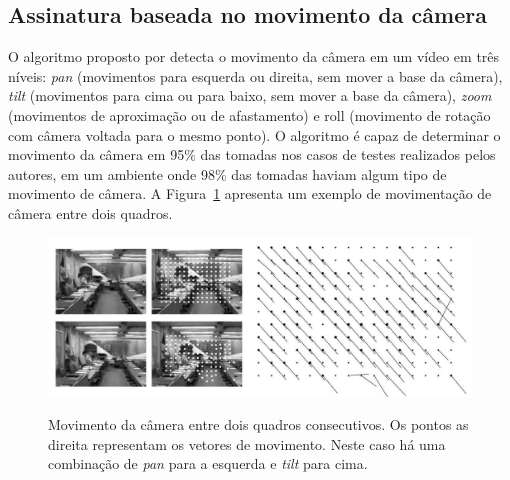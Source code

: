 %
%

\subsection{Assinatura baseada no movimento da câmera}
\label{wavelets}







O algoritmo proposto por  detecta o movimento da câmera em um vídeo em três níveis: \textit{pan} (movimentos para esquerda ou direita, sem mover a base da câmera), \textit{tilt} (movimentos para cima ou para baixo, sem mover a base da câmera), \textit{zoom} (movimentos de aproximação ou de afastamento) e roll (movimento de rotação com câmera voltada para o mesmo ponto). O algoritmo é capaz de determinar o movimento da câmera em 95\% das tomadas nos casos de testes realizados pelos autores, em um ambiente onde 98\% das tomadas haviam algum tipo de movimento de câmera. A Figura~\ref{fig:example_cameramotion} apresenta um exemplo de movimentação de câmera entre dois quadros.

\begin{figure}[h]
	\centering
	\caption{Movimento da câmera entre dois quadros consecutivos. Os pontos as direita representam os vetores de movimento. Neste caso há uma combinação de \textit{pan} para a esquerda e \textit{tilt} para cima.}
	\includegraphics[width=\textwidth]{dados/figuras/cameramotion-example}
	\label{fig:example_cameramotion}
\end{figure}

